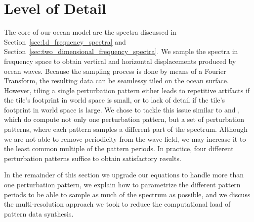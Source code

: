 \section{Level of Detail}
\label{sec:level_of_detail}
The core of our ocean model are the spectra discussed in 
Section~\ref{sec:1d_frequency_spectra} and 
Section~\ref{sec:two_dimensional_frequency_spectra}. We sample the spectra in 
frequency space to obtain vertical and horizontal displacements produced by 
ocean waves. Because the sampling process is done by means of a Fourier 
Transform, the resulting data can be seamlessy tiled on the ocean surface. 
However, tiling a single perturbation pattern either leads to repetitive 
artifacts if the tile's footprint in world space is small, or to lack of detail 
if the tile's footprint in world space is large. We chose to tackle this 
issue similar to \citet{misc:oceanlightingfft} and \citet{article:whitecaps},
which do compute not only one perturbation 
pattern, but a set of perturbation patterns, where each pattern samples a 
different part of the spectrum. Although we are not able to remove periodicity 
from the wave field, we may increase it to the least common multiple of the
pattern periods. In practice, four different perturbation patterns suffice to
obtain satisfactory results.

In the remainder of this section we upgrade our equations to handle more than
one perturbation pattern, we explain how to parametrize the different pattern
periods to be able to sample as much of the spectrum as possible, and we discuss
the multi-resolution approach we took to reduce the computational load of pattern
data synthesis.
